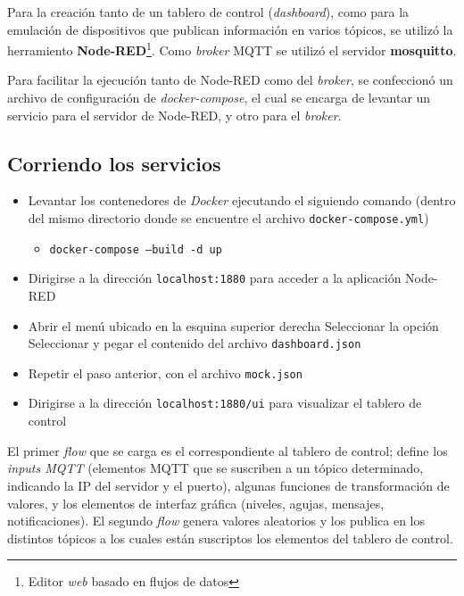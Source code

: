 Para la creación tanto de un tablero de control (\emph{dashboard}), como para la emulación de dispositivos que publican información en varios tópicos, se utilizó la herramiento \textbf{Node-RED}\footnote{Editor \emph{web} basado en flujos de datos\autocite{NodeRED}}. Como \emph{broker} MQTT se utilizó el servidor \textbf{mosquitto}.

Para facilitar la ejecución tanto de Node-RED como del \emph{broker}, se confeccionó un archivo de configuración de \emph{docker-compose}, el cual se encarga de levantar un servicio para el servidor de Node-RED, y otro para el \emph{broker}.   

\subsection{Corriendo los servicios}

\begin{itemize}
    \item Levantar los contenedores de \emph{Docker} ejecutando el siguiendo comando (dentro del mismo directorio donde se encuentre el archivo \texttt{docker-compose.yml})
    \begin{itemize}
        \item \texttt{docker-compose --build -d up} 
    \end{itemize}
    \item Dirigirse a la dirección \texttt{localhost:1880} para acceder a la aplicación Node-RED
    \item Abrir el menú ubicado en la esquina superior derecha \textrightarrow{} Seleccionar la opción  \textrightarrow{} Seleccionar  y pegar el contenido del archivo \texttt{dashboard.json} 
    \item Repetir el paso anterior, con el archivo \texttt{mock.json} 
    \item Dirigirse a la dirección \texttt{localhost:1880/ui} para visualizar el tablero de control 
\end{itemize}

El primer \emph{flow} que se carga es el correspondiente al tablero de control; define los \emph{inputs MQTT} (elementos MQTT que se suscriben a un tópico determinado, indicando la IP del servidor y el puerto), algunas funciones de transformación de valores, y los elementos de interfaz gráfica (niveles, agujas, mensajes, notificaciones). El segundo \emph{flow} genera valores aleatorios y los publica en los distintos tópicos a los cuales están suscriptos los elementos del tablero de control.  

